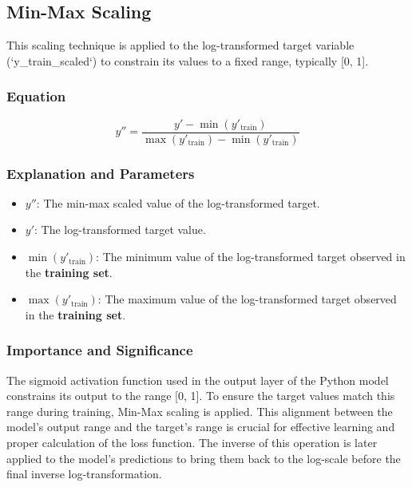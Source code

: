\documentclass[12pt, a4paper]{article}
\begin{document}
\subsection{Min-Max Scaling}
This scaling technique is applied to the log-transformed target variable (`y_train_scaled`) to constrain its values to a fixed range, typically [0, 1].

\subsubsection{Equation}
\begin{equation}
y'' = \frac{y' - \min(y'_{\text{train}})}{\max(y'_{\text{train}}) - \min(y'_{\text{train}})}
\label{eq:minmax}
\end{equation}

\subsubsection{Explanation and Parameters}
\begin{itemize}
    \item \textbf{$y''$}: The min-max scaled value of the log-transformed target.
    \item \textbf{$y'$}: The log-transformed target value.
    \item \textbf{$\min(y'_{\text{train}})$}: The minimum value of the log-transformed target observed in the \textbf{training set}.
    \item \textbf{$\max(y'_{\text{train}})$}: The maximum value of the log-transformed target observed in the \textbf{training set}.
\end{itemize}

\subsubsection{Importance and Significance}
The sigmoid activation function used in the output layer of the Python model constrains its output to the range [0, 1]. To ensure the target values match this range during training, Min-Max scaling is applied. This alignment between the model's output range and the target's range is crucial for effective learning and proper calculation of the loss function. The inverse of this operation is later applied to the model's predictions to bring them back to the log-scale before the final inverse log-transformation.

\newpage
\end{document}
